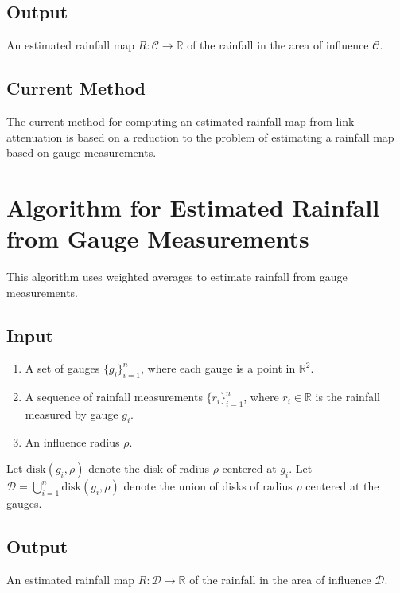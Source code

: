 \documentclass{article}
\newcommand{\R}{\mathbb{R}}
\newcommand{\disk}{\text{disk}}
\begin{document}
\subsection{Output}
An estimated rainfall map $R:\mathcal{C} \rightarrow \R$ of the rainfall in the area of influence $\mathcal{C}$.

\subsection{Current Method}
The current method for computing an estimated rainfall map from link attenuation is based on a reduction to the problem of estimating a rainfall map based on gauge measurements.

\section{Algorithm for Estimated Rainfall from Gauge Measurements}

This algorithm uses weighted averages to estimate rainfall from gauge measurements.

\subsection{Input}
\begin{enumerate}
    \item A set of gauges $\{g_i\}_{i=1}^n$, where each gauge is a point in $\R^2$.
    \item A sequence of rainfall measurements $\{r_i\}_{i=1}^n$, where $r_i\in\R$ is the rainfall measured by gauge $g_i$.
    \item An influence radius $\rho$.
\end{enumerate}

Let $\disk(g_i,\rho)$ denote the disk of radius $\rho$ centered at $g_i$. Let $\mathcal{D}=\bigcup_{i=1}^n \disk(g_i,\rho)$ denote the union of disks of radius $\rho$ centered at the gauges.

\subsection{Output}
An estimated rainfall map $R:\mathcal{D} \rightarrow \R$ of the rainfall in the area of influence $\mathcal{D}$.
\end{document}
